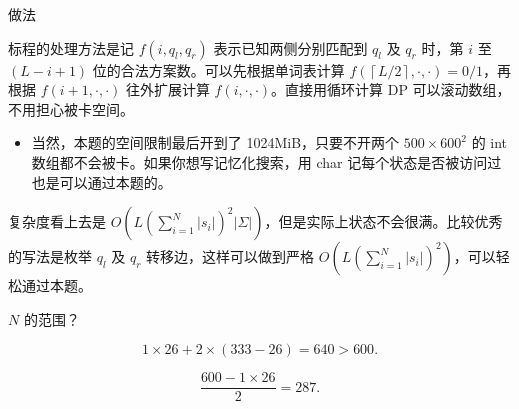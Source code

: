\begin{frame}{做法}
	
	标程的处理方法是记 $f\left(i,q_l, q_r\right)$ 表示已知两侧分别匹配到 $q_l$ 及 $q_r$ 时，第 $i$ 至 $(L-i+1)$ 位的合法方案数。可以先根据单词表计算 $f\left(\left\lceil L/2\right\rceil, \cdot, \cdot\right)=0/1$，再根据 $f(i+1,\cdot,\cdot)$ 往外扩展计算 $f(i,\cdot,\cdot)$。直接用循环计算 DP 可以滚动数组，不用担心被卡空间。
	\begin{itemize}
		\item 当然，本题的空间限制最后开到了 1024MiB，只要不开两个 $500\times 600^2$ 的 int 数组都不会被卡。如果你想写记忆化搜索，用 char 记每个状态是否被访问过也是可以通过本题的。
	\end{itemize}

	复杂度看上去是 $O\left(L \left(\sum_{i=1}^N \left|s_i\right|\right)^2 |\Sigma|\right)$，但是实际上状态不会很满。比较优秀的写法是枚举 $q_l$ 及 $q_r$ 转移边，这样可以做到严格 $O\left(L \left(\sum_{i=1}^N \left|s_i\right|\right)^2\right)$，可以轻松通过本题。

\end{frame}

\begin{frame}{$N$ 的范围？}
	
	$$1\times 26 + 2 \times (333 - 26) = 640 > 600.$$

	$$\frac{600-1\times 26}{2} = 287.$$

\end{frame}
